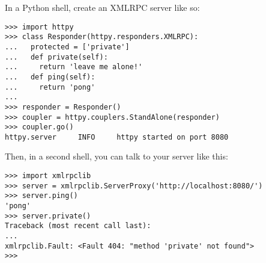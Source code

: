 In a Python shell, create an XMLRPC server like so:

\begin{verbatim}
>>> import httpy
>>> class Responder(httpy.responders.XMLRPC):
...   protected = ['private']
...   def private(self):
...     return 'leave me alone!'
...   def ping(self):
...     return 'pong'
...
>>> responder = Responder()
>>> coupler = httpy.couplers.StandAlone(responder)
>>> coupler.go()
httpy.server     INFO     httpy started on port 8080
\end{verbatim}

Then, in a second shell, you can talk to your server like this:

\begin{verbatim}
>>> import xmlrpclib
>>> server = xmlrpclib.ServerProxy('http://localhost:8080/')
>>> server.ping()
'pong'
>>> server.private()
Traceback (most recent call last):
...
xmlrpclib.Fault: <Fault 404: "method 'private' not found">
>>>
\end{verbatim}
